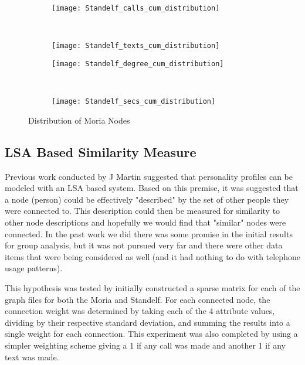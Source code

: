 \begin{figure*}[ht!]
	\centering
	\begin{subfigure}[b]{0.45\textwidth}
		\centering
		\texttt{[image: Standelf\_calls\_cum\_distribution]}
	\end{subfigure}%
	~
	\begin{subfigure}[b]{0.45\textwidth}
		\centering
		\texttt{[image: Standelf\_texts\_cum\_distribution]}
	\end{subfigure}
	

	\begin{subfigure}[b]{0.45\textwidth}
		\centering
		\texttt{[image: Standelf\_degree\_cum\_distribution]}
	\end{subfigure}%
	~
	\begin{subfigure}[b]{0.45\textwidth}
		\centering
		\texttt{[image: Standelf\_secs\_cum\_distribution]}
	\end{subfigure}
	\caption{Distribution of Moria Nodes}
	\label{fig:StandelfNodeDist}
\end{figure*}
\subsection{LSA Based Similarity Measure}
Previous work conducted by J Martin suggested that personality profiles can be modeled with an LSA based system.
Based on this premise, it was suggested that a node (person) could be effectively "described" by the set of other people
they were connected to.  This description could then be measured for
similarity to other node descriptions and hopefully we would find that
"similar" nodes were connected. In the past work we did there was some promise
in the initial results for group analysis, but it was not pursued very far and
there were other data items that were being considered as well (and it had
nothing to do with telephone usage patterns).

This hypothesis was tested by initially constructed a sparse matrix for each of the
graph files for both the Moria and Standelf.  For each connected node, the
connection weight was determined by taking each of the 4 attribute values,
dividing by their respective standard deviation, and summing the results into
a single weight for each connection. This experiment was also completed by using a
simpler weighting scheme giving a 1 if any call was made and another 1 if any
text was made.

